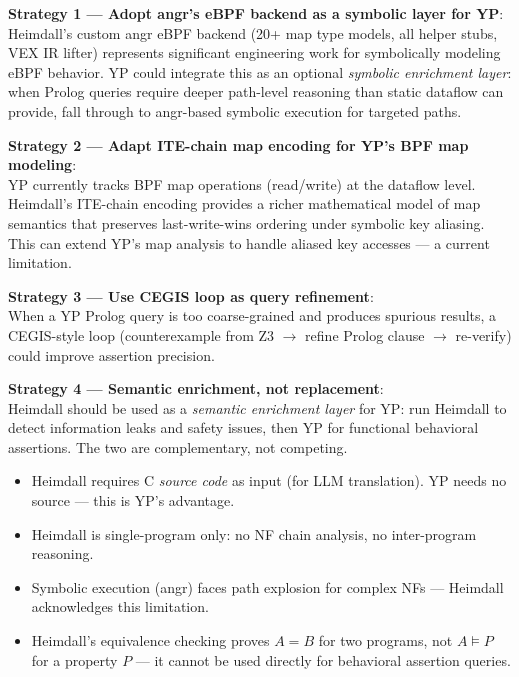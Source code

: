 \documentclass[12pt, a4paper]{article}
\begin{document}
\begin{strategybox}
\textbf{Strategy 1 — Adopt angr's eBPF backend as a symbolic layer for YP}:\\
Heimdall's custom angr eBPF backend (20+ map type models, all helper stubs, VEX IR lifter) represents significant engineering work for symbolically modeling eBPF behavior. YP could integrate this as an optional \emph{symbolic enrichment layer}: when Prolog queries require deeper path-level reasoning than static dataflow can provide, fall through to angr-based symbolic execution for targeted paths.

\textbf{Strategy 2 — Adapt ITE-chain map encoding for YP's BPF map modeling}:\\
YP currently tracks BPF map operations (read/write) at the dataflow level. Heimdall's ITE-chain encoding provides a richer mathematical model of map semantics that preserves last-write-wins ordering under symbolic key aliasing. This can extend YP's map analysis to handle aliased key accesses --- a current limitation.

\textbf{Strategy 3 — Use CEGIS loop as query refinement}:\\
When a YP Prolog query is too coarse-grained and produces spurious results, a CEGIS-style loop (counterexample from Z3 $\to$ refine Prolog clause $\to$ re-verify) could improve assertion precision.

\textbf{Strategy 4 — Semantic enrichment, not replacement}:\\
Heimdall should be used as a \emph{semantic enrichment layer} for YP: run Heimdall to detect information leaks and safety issues, then YP for functional behavioral assertions. The two are complementary, not competing.
\end{strategybox}

\begin{limitbox}
\begin{itemize}
  \item Heimdall requires C \emph{source code} as input (for LLM translation). YP needs no source --- this is YP's advantage.
  \item Heimdall is single-program only: no NF chain analysis, no inter-program reasoning.
  \item Symbolic execution (angr) faces path explosion for complex NFs --- Heimdall acknowledges this limitation.
  \item Heimdall's equivalence checking proves $A = B$ for two programs, not $A \models P$ for a property $P$ --- it cannot be used directly for behavioral assertion queries.
\end{itemize}
\end{limitbox}
\end{document}

